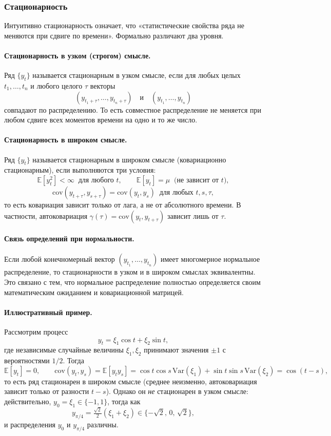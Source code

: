 \documentclass[12pt,a4paper]{article}
\begin{document}
\subsubsection{Стационарность}

Интуитивно стационарность означает, что «статистические свойства ряда не меняются при сдвиге по времени». Формально различают два уровня.

\paragraph{Стационарность в узком (строгом) смысле.}
Ряд $\{y_t\}$ называется стационарным в узком смысле, если для любых целых $t_1,\dots,t_n$ и любого целого $\tau$ векторы
\[
(y_{t_1+\tau},\dots,y_{t_n+\tau}) \quad\text{и}\quad (y_{t_1},\dots,y_{t_n})
\]
совпадают по распределению. То есть совместное распределение не меняется при любом сдвиге всех моментов времени на одно и то же число.

\paragraph{Стационарность в широком смысле.}
Ряд $\{y_t\}$ называется стационарным в широком смысле (ковариационно стационарным), если выполняются три условия:
\[
\mathbb{E}[y_t^2]<\infty \;\;\text{для любого } t, \qquad
\mathbb{E}[y_t]=\mu \;\;\text{(не зависит от } t),
\]
\[
\mathrm{cov}(y_{t+\tau},y_{s+\tau})=\mathrm{cov}(y_t,y_s)\;\;\text{для любых } t,s,\tau,
\]
то есть ковариация зависит только от лага, а не от абсолютного времени. В частности, автоковариация $\gamma(\tau)=\mathrm{cov}(y_t,y_{t+\tau})$ зависит лишь от $\tau$.

\paragraph{Связь определений при нормальности.}
Если любой конечномерный вектор $(y_{t_1},\dots,y_{t_n})$ имеет многомерное нормальное распределение, то стационарности в узком и в широком смыслах эквивалентны. Это связано с тем, что нормальное распределение полностью определяется своим математическим ожиданием и ковариационной матрицей.

\paragraph{Иллюстративный пример.}
Рассмотрим процесс
\[
y_t=\xi_1\cos t+\xi_2\sin t,
\]
где независимые случайные величины $\xi_1,\xi_2$ принимают значения $\pm 1$ с вероятностями $1/2$. Тогда
\[
\mathbb{E}[y_t]=0,\qquad
\mathrm{cov}(y_t,y_s)=\mathbb{E}[y_t y_s]=\cos t\cos s\,\mathrm{Var}(\xi_1)+\sin t\sin s\,\mathrm{Var}(\xi_2)=\cos(t-s),
\]
то есть ряд стационарен в широком смысле (среднее неизменно, автоковариация зависит только от разности $t-s$). Однако он \emph{не} стационарен в узком смысле: действительно, $y_0=\xi_1\in\{-1,1\}$, тогда как
\[
y_{\pi/4}=\tfrac{\sqrt{2}}{2}(\xi_1+\xi_2)\in\{-\sqrt{2},\,0,\,\sqrt{2}\},
\]
и распределения $y_0$ и $y_{\pi/4}$ различны.
\end{document}
